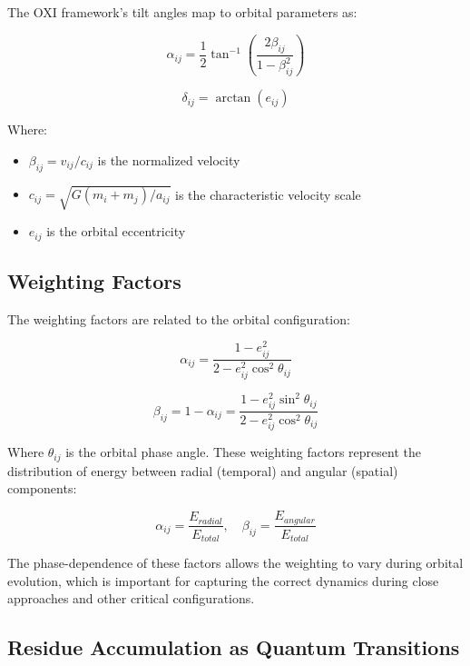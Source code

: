 \documentclass{article}
\begin{document}
The OXI framework's tilt angles map to orbital parameters as:

\begin{equation}
\alpha_{ij} = \frac{1}{2}\tan^{-1}\left(\frac{2\beta_{ij}}{1-\beta_{ij}^2}\right)
\end{equation}

\begin{equation}
\delta_{ij} = \arctan(e_{ij})
\end{equation}

Where:
\begin{itemize}
\item $\beta_{ij} = v_{ij}/c_{ij}$ is the normalized velocity
\item $c_{ij} = \sqrt{G(m_i+m_j)/a_{ij}}$ is the characteristic velocity scale
\item $e_{ij}$ is the orbital eccentricity
\end{itemize}

\subsection{Weighting Factors}

The weighting factors are related to the orbital configuration:

\begin{equation}
\alpha_{ij} = \frac{1-e_{ij}^2}{2-e_{ij}^2\cos^2\theta_{ij}}
\end{equation}

\begin{equation}
\beta_{ij} = 1 - \alpha_{ij} = \frac{1-e_{ij}^2\sin^2\theta_{ij}}{2-e_{ij}^2\cos^2\theta_{ij}}
\end{equation}

Where $\theta_{ij}$ is the orbital phase angle. These weighting factors represent the distribution of energy between radial (temporal) and angular (spatial) components:

\begin{equation}
\alpha_{ij} = \frac{E_{radial}}{E_{total}}, \quad \beta_{ij} = \frac{E_{angular}}{E_{total}}
\end{equation}

The phase-dependence of these factors allows the weighting to vary during orbital evolution, which is important for capturing the correct dynamics during close approaches and other critical configurations.

\subsection{Residue Accumulation as Quantum Transitions}
\end{document}
